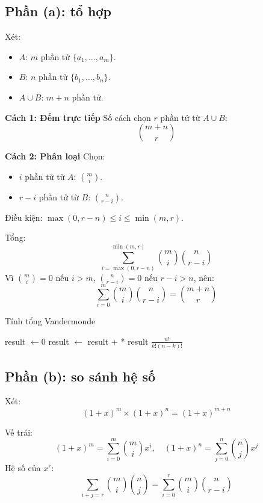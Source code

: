 \documentclass[a4paper,12pt]{article}
\theoremstyle{plain}
\theoremstyle{definition}
\begin{document}
\subsection*{Phần (a): tổ hợp}

Xét:
\begin{itemize}
    \item \( A \): \( m \) phần tử \( \{a_1, \ldots, a_m\} \).
    \item \( B \): \( n \) phần tử \( \{b_1, \ldots, b_n\} \).
    \item \( A \cup B \): \( m+n \) phần tử.
\end{itemize}

\textbf{Cách 1: Đếm trực tiếp}
Số cách chọn \( r \) phần tử từ \( A \cup B \):
\[
\binom{m+n}{r}
\]

\textbf{Cách 2: Phân loại}
Chọn:
\begin{itemize}
    \item \( i \) phần tử từ \( A \): \( \binom{m}{i} \).
    \item \( r-i \) phần tử từ \( B \): \( \binom{n}{r-i} \).
\end{itemize}
Điều kiện: \( \max(0, r-n) \leq i \leq \min(m, r) \).

Tổng:
\[
\sum_{i=\max(0,r-n)}^{\min(m,r)} \binom{m}{i}\binom{n}{r-i}
\]
Vì \( \binom{m}{i} = 0 \) nếu \( i > m \), \( \binom{n}{r-i} = 0 \) nếu \( r-i > n \), nên:
\[
\sum_{i=0}^m \binom{m}{i}\binom{n}{r-i} = \binom{m+n}{r}
\]


\begin{algorithm}
\caption{Tính tổng Vandermonde}
\begin{algorithmic}
    \State result $\gets 0$
            \State result $\gets$ result +  * 
        \EndIf
    \EndFor
    \State \Return result
\EndFunction
{}
     
    \EndIf
    \State \Return $\frac{n!}{k!(n-k)!}$
\EndFunction
\end{algorithmic}
\end{algorithm}

\subsection*{Phần (b): so sánh hệ số}

Xét:
\[
(1+x)^m \times (1+x)^n = (1+x)^{m+n}
\]

Vế trái:
\[
(1+x)^m = \sum_{i=0}^m \binom{m}{i}x^i, \quad (1+x)^n = \sum_{j=0}^n \binom{n}{j}x^j
\]
Hệ số của \( x^r \):
\[
\sum_{i+j=r} \binom{m}{i}\binom{n}{j} = \sum_{i=0}^r \binom{m}{i}\binom{n}{r-i}
\]
\end{document}
